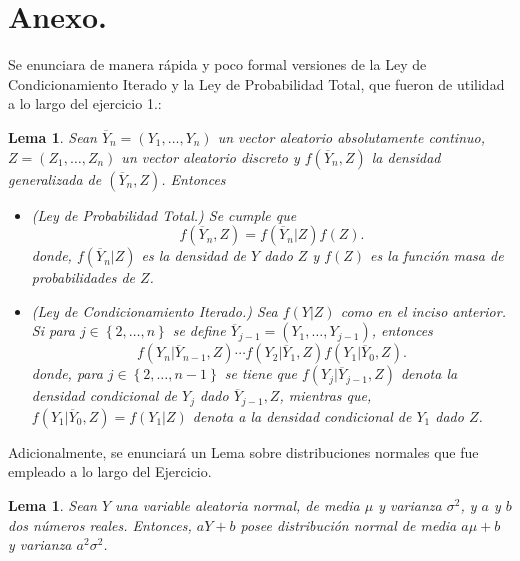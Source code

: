 \documentclass[10.5pt,notitlepage]{article}
\newcommand{\kis}[1]{\left\{ #1 \right\}}
\theoremstyle{plain}
\newtheorem{lem}[thm]{Lema} %
\begin{document}
\section{Anexo.}\label{Anex}
Se enunciara de manera rápida y poco formal versiones de la Ley de Condicionamiento Iterado y la Ley de Probabilidad Total, que fueron de utilidad a lo largo del ejercicio 1.: 
\begin{lem}
Sean \(\overline{Y}_n = (Y_1, \hdots, Y_{n})\) un vector aleatorio absolutamente continuo, \(Z = (Z_{1}, \hdots, Z_{n})\) un vector aleatorio discreto y \(f(\overline{Y}_n,Z)\) la densidad generalizada de \((\overline{Y}_n,Z)\). Entonces
\begin{itemize}
    \item[1.] (Ley de Probabilidad Total.) Se cumple que 
    \[
    f(\overline{Y}_n, Z) = f(\overline{Y}_{n}|Z)f(Z).
    \]
    donde, \(f(\overline{Y}_{n}|Z)\) es la densidad de \(Y\) dado \(Z\) y \(f(Z)\) es la función masa de probabilidades de \(Z\).
    \item[2.] (Ley de Condicionamiento Iterado.) Sea \(f(Y|Z)\) como en el inciso anterior. Si para \(j \in \kis{2,\hdots,n}\) se define \(\overline{Y}_{j-1} =  (Y_{1}, \hdots, Y_{j-1})\), entonces 
    \[
     f(Y_n| \overline{Y}_{n-1},Z)\cdots f(Y_{2}|\overline{Y}_{1},Z)f(Y_{1}|\overline{Y}_{0},Z).
    \]
    donde, para \(j \in \kis{2, \hdots, n-1}\) se tiene que \(f(Y_j| \overline{Y}_{j-1},Z)\) denota la densidad condicional de \(Y_{j}\) dado \(\overline{Y}_{j-1},Z\), mientras que, \(f(Y_{1}|\overline{Y}_{0},Z) = f(Y_{1}|Z)\) denota a la densidad condicional de \(Y_{1}\) dado \(Z\).
\end{itemize}
\end{lem}
Adicionalmente, se enunciará un Lema sobre distribuciones normales que fue empleado a lo largo del Ejercicio.
\begin{lem}\label{lem.1}
Sean \(Y\) una variable aleatoria normal, de media \(\mu\) y varianza \(\sigma^2\), y \(a\) y \(b\) dos números reales. Entonces, \(a Y + b\) posee distribución normal de media \(a \mu + b\) y varianza \(a^2 \sigma^2\). 
\end{lem}


\newpage
\nocite{*}
\printbibliography
\end{document}
